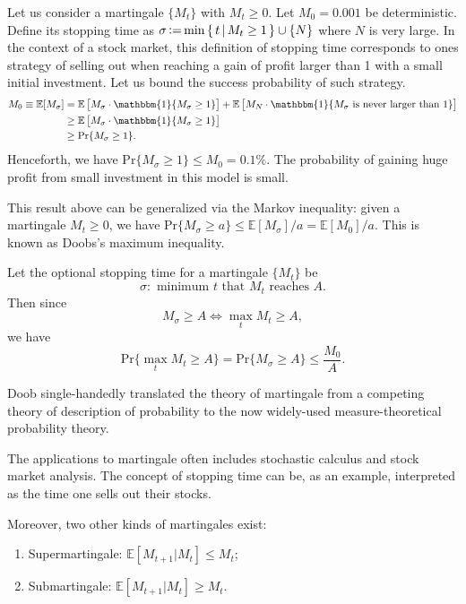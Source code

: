 \begin{example}
    Let us consider a martingale $\{M_t\}$ with $M_t\ge0$. Let $M_0=0.001$ be deterministic. Define its stopping time as $\sigma\operatorname{\vcentcolon=}\min\left\{\,{t}\,\middle\vert\,{M_t\ge1}\,\right\}\cup\{N\}$ where $N$ is very large. In the context of a stock market, this definition of stopping time corresponds to ones strategy of selling out when reaching a gain of profit larger than 1 with a small initial investment. Let us bound the success probability of such strategy.
    \begin{align*}
        M_0 \equiv \mathbb{E}[M_\sigma] &= \mathbb{E}\left[M_\sigma\cdot\mathbbm{1}\{M_\sigma\ge1\}\right] + \mathbb{E}\left[M_N\cdot\mathbbm{1}\{M_\sigma\text{ is never larger than }1\}\right] \\
        &\ge \mathbb{E}\left[M_\sigma\cdot\mathbbm{1}\{M_\sigma\ge1\}\right] \\
        &\ge \mathrm{Pr}\{M_\sigma\ge1\}.
    \end{align*}
    Henceforth, we have $\mathrm{Pr}\{M_\sigma\ge1\}\le M_0=0.1\%$. The probability of gaining huge profit from small investment in this model is small.
\end{example}
This result above can be generalized via the Markov inequality: given a martingale $M_t\ge0$, we have $\mathrm{Pr}\{M_\sigma\ge a\} \le \mathbb{E}[M_\sigma]/a = \mathbb{E}[M_0]/a$. This is known as Doobs's maximum inequality.
\begin{theorem}
    Let the optional stopping time for a martingale $\{M_t\}$ be
    \begin{equation}
        \sigma:\text{ minimum }t\text{ that }M_t\text{ reaches }A.
    \end{equation}
    Then since
    \begin{equation}
        M_\sigma \ge A \Leftrightarrow \max_t M_t \ge A,
    \end{equation}
    we have
    \begin{equation}
        \mathrm{Pr}\{\max_t M_t\ge A\} = \mathrm{Pr}\{M_\sigma\ge A\} \le \frac{M_0}{A}.
    \end{equation}
\end{theorem}
\begin{remark}
    Doob single-handedly translated the theory of martingale from a competing theory of description of probability to the now widely-used measure-theoretical probability theory.
\end{remark}
\begin{remark}
    The applications to martingale often includes stochastic calculus and stock market analysis. The concept of stopping time can be, as an example, interpreted as the time one sells out their stocks.

    Moreover, two other kinds of martingales exist:
    \begin{enumerate}
        \item Supermartingale: $\mathbb{E}[M_{t+1}\vert M_t] \le M_t$;
        \item Submartingale: $\mathbb{E}[M_{t+1}\vert M_t] \ge M_t$.
    \end{enumerate}
\end{remark}


